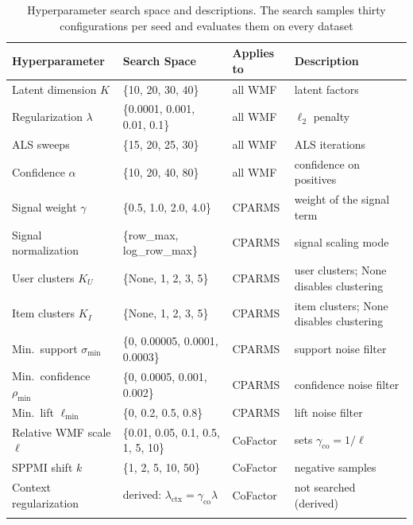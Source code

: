 \documentclass[pdflatex,sn-vancouver-num]{sn-jnl}%
\theoremstyle{thmstyleone}%
\theoremstyle{thmstyletwo}%
\theoremstyle{thmstylethree}%
\begin{document}
\begin{table}[ht]
\caption{Hyperparameter search space and descriptions. The search samples thirty configurations
per seed and evaluates them on every dataset}
\label{tab:search_space}
\centering
\footnotesize
\begin{tabular}{@{}llll@{}}
\toprule
Hyperparameter & Search Space & Applies to & Description \\
\midrule
Latent dimension $K$      & \{10, 20, 30, 40\}                 & all WMF & latent factors \\
Regularization $\lambda$  & \{0.0001, 0.001, 0.01, 0.1\}       & all WMF & $\ell_2$ penalty \\
ALS sweeps                & \{15, 20, 25, 30\}                 & all WMF & ALS iterations \\
Confidence $\alpha$       & \{10, 20, 40, 80\}                 & all WMF & confidence on positives \\
Signal weight $\gamma$    & \{0.5, 1.0, 2.0, 4.0\}             & CPARMS  & weight of the signal term \\
Signal normalization      & \{row\_max, log\_row\_max\}        & CPARMS  & signal scaling mode \\
User clusters $K_U$       & \{None, 1, 2, 3, 5\}               & CPARMS  & user clusters; None disables clustering \\
Item clusters $K_I$       & \{None, 1, 2, 3, 5\}               & CPARMS  & item clusters; None disables clustering \\
Min.\ support $\sigma_{\min}$  & \{0, 0.00005, 0.0001, 0.0003\} & CPARMS & support noise filter \\
Min.\ confidence $\rho_{\min}$ & \{0, 0.0005, 0.001, 0.002\}    & CPARMS & confidence noise filter \\
Min.\ lift $\ell_{\min}$       & \{0, 0.2, 0.5, 0.8\}           & CPARMS & lift noise filter \\
Relative WMF scale $\ell$ & \{0.01, 0.05, 0.1, 0.5, 1, 5, 10\} & CoFactor & sets $\gamma_{\mathrm{co}}=1/\ell$ \\
SPPMI shift $k$           & \{1, 2, 5, 10, 50\}                & CoFactor & negative samples \\
Context regularization    & derived: $\lambda_{\mathrm{ctx}}=\gamma_{\mathrm{co}}\lambda$ & CoFactor & not searched (derived) \\
\botrule
\end{tabular}
\end{table}
\end{document}
